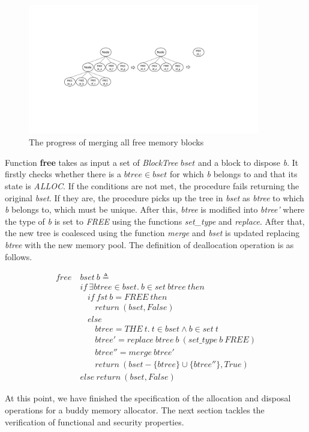 \begin{figure}[htbp]
	\centering
	\includegraphics[width=0.9\textwidth]{fig2.pdf}
	\caption{The progress of merging all free memory blocks}
	\label{fig:merginfreeblocks}
\end{figure}

Function \textbf{free} takes as input a set of \emph{BlockTree} $bset$ and a block to dispose \emph{b}. It firstly checks whether there is a $btree \in bset$ for which \emph{b} belongs to and that its state is \emph{ALLOC}. If the conditions are not met, the procedure fails returning the original \emph{bset}. If they are, the procedure picks up the  tree in \emph{bset} as \emph{btree} to which \emph{b} belongs to, which must be unique. After this, \emph{btree} is modified into \emph{btree'} where the type of \emph{b} is set to \emph{FREE} using the functions \emph{set\_type} and \emph{replace}. After that, the new tree is coalesced using the function \emph{merge} and \emph{bset} is updated replacing \emph{btree} with the new memory pool. The definition of deallocation operation is as follows.

\begin{definition} 
\end{definition}
\vspace{-7pt}
{\footnotesize
\begin{align*}
free\ &bset\ b \triangleq \\
&if\ \exists btree \in bset.\ b \in set\ btree\ then \\
&\ \ \ \ if\ fst\ b = FREE\ then \\
&\ \ \ \ \ \ \ \ return\ (bset, False) \\
&\ \ \ \ else \\
&\ \ \ \ \ \ \ \ btree = THE\ t.\ t \in bset \wedge b \in set\ t \\
&\ \ \ \ \ \ \ \ btree' = replace\ btree\ b\ (set\_type\ b\ FREE) \\
&\ \ \ \ \ \ \ \ btree'' = merge\ btree' \\
&\ \ \ \ \ \ \ \ return\ (bset - \lbrace btree \rbrace \cup \lbrace btree'' \rbrace, True) \\
&else\ return\ (bset, False)
\end{align*}
}
\vspace{-12pt}

At this point, we have finished the specification of the allocation and disposal operations for a buddy memory allocator. The next section tackles the verification of functional and security properties.